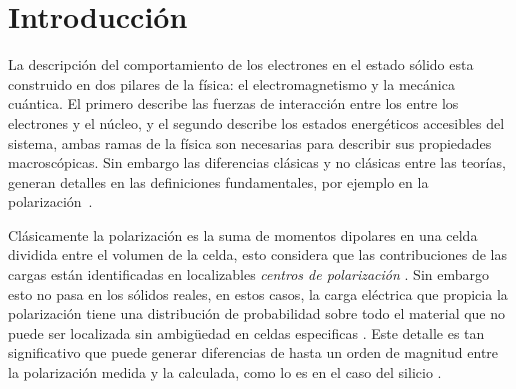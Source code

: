 \chapter{Introducción} %



La descripción del comportamiento de los electrones en el estado sólido esta construido en dos pilares de la física: el electromagnetismo y la mecánica cuántica. El primero describe las fuerzas de interacción entre los entre los electrones y el núcleo, y el segundo describe los estados energéticos accesibles del sistema, ambas ramas de la física son necesarias para describir sus propiedades macroscópicas. Sin embargo las diferencias clásicas y no clásicas entre las teorías, generan detalles en las definiciones fundamentales, por ejemplo en la polarización~\cite{Shore2018}.


Clásicamente la polarización es la suma de momentos dipolares en una celda dividida entre el volumen de la celda, esto considera que las contribuciones de las cargas están identificadas en localizables {\it centros de polarización} . Sin embargo esto no pasa en los sólidos reales, en estos casos, la carga eléctrica que propicia la polarización tiene una distribución de probabilidad sobre todo el material que no puede ser localizada sin ambigüedad en celdas especificas . Este detalle es tan significativo que puede generar diferencias de hasta un orden de magnitud entre la polarización medida y la calculada, como lo es en el caso del silicio \cite{rabe2007modern}.

